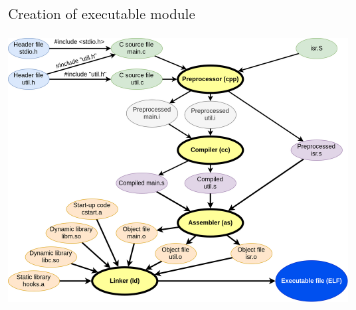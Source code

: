 \begin{frame}{Creation of executable module}
    \begin{center}
        \includegraphics[height=7cm]{01_flow2.png}
    \end{center}
\end{frame}

